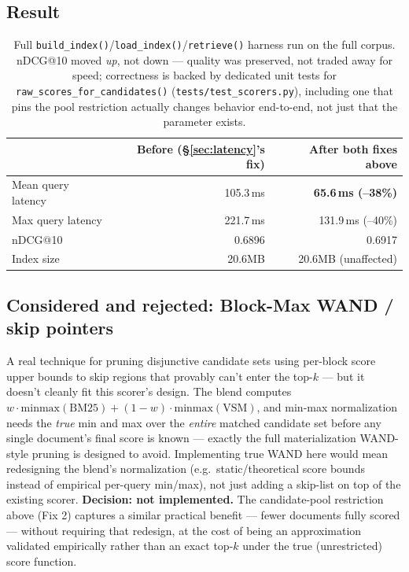 \documentclass[11pt]{article}
\begin{document}
\subsection{Result}
\begin{table}[h]
\centering
\begin{tabular}{lrr}
\toprule
 & Before (\S\ref{sec:latency}'s fix) & After both fixes above \\
\midrule
Mean query latency & 105.3\,ms & \textbf{65.6\,ms (--38\%)} \\
Max query latency & 221.7\,ms & 131.9\,ms (--40\%) \\
nDCG@10 & 0.6896 & 0.6917 \\
Index size & 20.6MB & 20.6MB (unaffected) \\
\bottomrule
\end{tabular}
\caption{Full \texttt{build\_index()}/\texttt{load\_index()}/\texttt{retrieve()}
harness run on the full corpus. nDCG@10 moved \emph{up}, not down ---
quality was preserved, not traded away for speed; correctness is backed
by dedicated unit tests for \texttt{raw\_scores\_for\_candidates()}
(\texttt{tests/test\_scorers.py}), including one that pins the pool
restriction actually changes behavior end-to-end, not just that the
parameter exists.}
\end{table}

\subsection{Considered and rejected: Block-Max WAND / skip pointers}
A real technique for pruning disjunctive candidate sets using per-block
score upper bounds to skip regions that provably can't enter the top-$k$
--- but it doesn't cleanly fit this scorer's design. The blend computes
$w \cdot \text{minmax}(\text{BM25}) + (1-w) \cdot \text{minmax}(\text{VSM})$,
and min-max normalization needs the \emph{true} min and max over the
\emph{entire} matched candidate set before any single document's final
score is known --- exactly the full materialization WAND-style pruning
is designed to avoid. Implementing true WAND here would mean redesigning
the blend's normalization (e.g.\ static/theoretical score bounds instead
of empirical per-query min/max), not just adding a skip-list on top of
the existing scorer. \textbf{Decision: not implemented.} The
candidate-pool restriction above (Fix 2) captures a similar practical
benefit --- fewer documents fully scored --- without requiring that
redesign, at the cost of being an approximation validated empirically
rather than an exact top-$k$ under the true (unrestricted) score
function.
\end{document}
